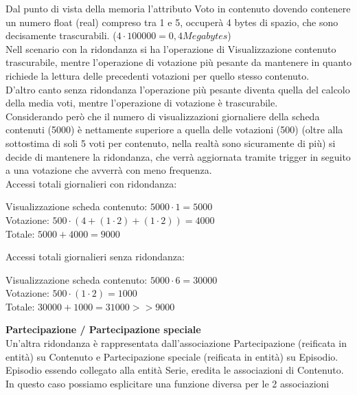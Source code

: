 \documentclass[a4paper]{article}
\begin{document}
Dal punto di vista della memoria l'attributo Voto in contenuto dovendo contenere un numero float (real) compreso tra 1 e 5, occuperà 
4 bytes di spazio, che sono decisamente trascurabili. ($ 4 \cdot 100000 = 0,4 Megabytes $)\\
Nell scenario con la ridondanza si ha l'operazione di Visualizzazione contenuto trascurabile, mentre l'operazione 
di votazione più pesante da mantenere in quanto richiede la lettura delle precedenti votazioni per quello stesso contenuto.\\
D'altro canto senza ridondanza l'operazione più pesante diventa quella del calcolo della media voti, mentre l'operazione di votazione 
è trascurabile. \\
Considerando però che il numero di visualizzazioni giornaliere della scheda contenuti (5000) è nettamente superiore 
a quella delle votazioni (500) (oltre alla sottostima di soli 5 voti per contenuto, nella realtà sono sicuramente di più) 
si decide di mantenere la ridondanza, che verrà aggiornata tramite trigger in seguito a una votazione che avverrà con meno frequenza.\\
Accessi totali giornalieri con ridondanza: \\
\begin{center}
Visualizzazione scheda contenuto: \quad $ 5000 \cdot 1 = 5000 $ \\
Votazione: \quad $ 500 \cdot (4 + ( 1 \cdot 2) + ( 1 \cdot 2)) = 4000 $ \\
Totale: \quad $ 5000 + 4000  = 9000 $ \\
\end{center}
Accessi totali giornalieri senza ridondanza: \\
\begin{center}
Visualizzazione scheda contenuto: \quad $ 5000 \cdot 6 = 30000 $ \\
Votazione: \quad $ 500 \cdot ( 1 \cdot 2) = 1000 $ \\
Totale: \quad $ 30000 + 1000 = 31000 >> 9000$ \\
\end{center}
\textbf{Partecipazione / Partecipazione speciale}\\
Un'altra ridondanza è rappresentata dall'associazione Partecipazione (reificata in entità) su Contenuto e Partecipazione 
speciale (reificata in entità) su Episodio.\\
Episodio essendo collegato alla entità Serie, eredita le associazioni di Contenuto. \\
In questo caso possiamo esplicitare una funzione diversa per le 2 associazioni
\end{document}
